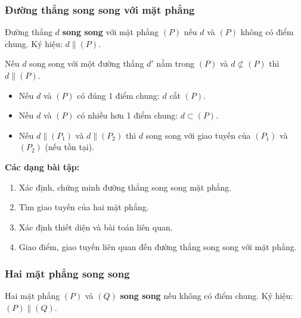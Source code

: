 \documentclass[12pt,a4paper]{article}
\begin{document}
\subsubsection{Đường thẳng song song với mặt phẳng}

\begin{dinhnghia}
  Đường thẳng $d$ \textbf{song song} với mặt phẳng $(P)$ nếu $d$ và $(P)$ không có điểm chung. Ký hiệu: $d \parallel (P)$.
\end{dinhnghia}

\begin{dinhly}[title={Dấu hiệu nhận biết}]
  Nếu $d$ song song với một đường thẳng $d'$ nằm trong $(P)$ và $d \not\subset (P)$ thì $d \parallel (P)$.
\end{dinhly}

\begin{tinhchat}
  \begin{itemize}
    \item Nếu $d$ và $(P)$ có đúng 1 điểm chung: $d$ cắt $(P)$.
    \item Nếu $d$ và $(P)$ có nhiều hơn 1 điểm chung: $d \subset (P)$.
    \item Nếu $d \parallel (P_1)$ và $d \parallel (P_2)$ thì $d$ song song với giao tuyến của $(P_1)$ và $(P_2)$ (nếu tồn tại).
  \end{itemize}
\end{tinhchat}

\medskip\noindent\textbf{Các dạng bài tập:}
\begin{enumerate}[label=\textbf{Dạng \arabic*:}, leftmargin=*, align=left]
  \item Xác định, chứng minh đường thẳng song song mặt phẳng.
  \item Tìm giao tuyến của hai mặt phẳng.
  \item Xác định thiết diện và bài toán liên quan.
  \item Giao điểm, giao tuyến liên quan đến đường thẳng song song với mặt phẳng.
\end{enumerate}

\subsubsection{Hai mặt phẳng song song}

\begin{dinhnghia}
  Hai mặt phẳng $(P)$ và $(Q)$ \textbf{song song} nếu không có điểm chung. Ký hiệu: $(P) \parallel (Q)$.
\end{dinhnghia}
\end{document}
